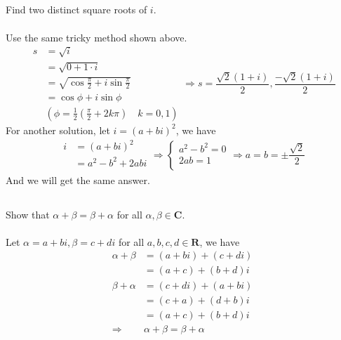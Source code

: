 \documentclass[a4paper]{article}
\begin{document}
\subsection{}
Find two distinct square roots of $i$.
\paragraph{}
Use the same tricky method shown above.
$$
    \begin{aligned}
        s & = \sqrt{i}                                               \\
          & = \sqrt{0+1 \cdot i}                                     \\
          & = \sqrt{\cos{\frac{\pi}{2}} + i\sin{\frac{\pi}{2}}}      \\
          & = \cos{\phi} + i\sin{\phi}                               \\
          & (\phi = \frac{1}{2}(\frac{\pi}{2}+2k\pi) \quad k = 0, 1)
    \end{aligned}
    \Rightarrow s = \frac{\sqrt{2}(1+i)}{2},\frac{-\sqrt{2}(1+i)}{2}
$$
For another solution, let $i = (a+bi)^2$, we have
$$
    \begin{aligned}
        i & = (a+bi)^2         \\
          & = a^2 - b^2 + 2abi \\
    \end{aligned}
    \Rightarrow
    \begin{cases}
        a^2 - b^2 = 0 \\
        2ab = 1       \\
    \end{cases}
    \Rightarrow
    a = b = \pm\frac{\sqrt{2}}{2}
$$
And we will get the same answer.

\subsection{}
Show that $\alpha + \beta = \beta + \alpha$ for all $\alpha, \beta \in \bm{C}.$
\paragraph{}
Let $\alpha = a + bi, \beta = c + di$ for all $a,b,c,d \in \bm{R}$, we have
$$
    \begin{aligned}
        \alpha + \beta    & = (a + bi) + (c + di)           \\
                          & = (a + c) + (b + d)i            \\
        \beta + \alpha    & = (c + di) + (a + bi)           \\
                          & = (c + a) + (d + b)i            \\
                          & = (a + c) + (b + d)i            \\
        \Rightarrow \quad & \alpha + \beta = \beta + \alpha
    \end{aligned}
$$
\end{document}
